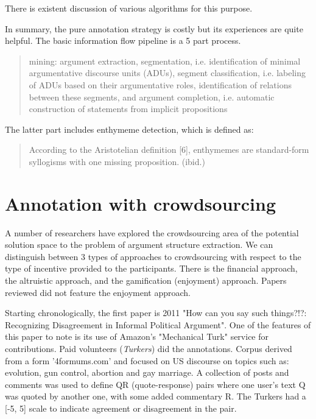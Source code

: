 \documentclass{report}
\begin{document}
There is existent discussion \cite{artstein_inter-coder_2008} of various algorithms for this purpose.

In summary, the pure annotation strategy is costly but its experiences are quite helpful. The basic information flow pipeline is a 5 part process. \cite{noauthor_finding_nodate}
\begin{quote}
   mining: argument extraction, segmentation, i.e. identification of minimal argumentative discourse units (ADUs), segment classification, i.e. labeling of ADUs based on their argumentative roles, identification of relations between these segments, and argument completion, i.e. automatic construction of statements from implicit propositions
\end{quote}
\cite[page 114]{noauthor_finding_nodate}


The latter part includes enthymeme detection, which is defined as:
\begin{quote}
According to the Aristotelian definition [6], enthymemes are standard-form syllogisms with one missing proposition.  (ibid.)
\end{quote}
\cite[page 113]{noauthor_finding_nodate}

\section{Annotation with crowdsourcing}
A number of researchers have explored the crowdsourcing area of the potential solution space to the problem of argument structure extraction.
We can distinguish between 3 types of approaches to crowdsourcing with respect to the type of incentive provided to the participants. \cite{von_ahn_designing_2008}
There is the financial approach, the altruistic approach, and the gamification (enjoyment) approach. Papers reviewed did not feature the enjoyment approach.

Starting chronologically, the first paper is  2011 "How can you say such things?!?: Recognizing Disagreement in Informal Political Argument".
\cite{abbott_how_2011}
One of the features of this paper to note is its use of Amazon's "Mechanical Turk" service for contributions. Paid volunteers (\textit{Turkers}) did the annotations. 
Corpus derived from a form '4formums.com' and focused on US discourse on topics such as: evolution, gun control, abortion and gay marriage. A collection of posts and comments was used to define QR (quote-response) pairs where one user's text Q was quoted by another one, with some added commentary R. The Turkers had a [-5, 5] scale to indicate agreement or disagreement in the pair.
\end{document}
